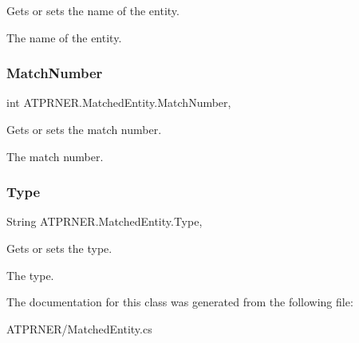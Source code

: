 Gets or sets the name of the entity. 

The name of the entity.\hypertarget{class_a_t_p_r_n_e_r_1_1_matched_entity_ad6ca936e2b54158984f7d7d3753d1490}{}\label{class_a_t_p_r_n_e_r_1_1_matched_entity_ad6ca936e2b54158984f7d7d3753d1490} 
\subsubsection{\texorpdfstring{Match\+Number}{MatchNumber}}
{\footnotesize\ttfamily int A\+T\+P\+R\+N\+E\+R.\+Matched\+Entity.\+Match\+Number\hspace{0.3cm}{\ttfamily [get]}, {\ttfamily [set]}}



Gets or sets the match number. 

The match number.\hypertarget{class_a_t_p_r_n_e_r_1_1_matched_entity_af7d651ec944931f14c26eedffc4150de}{}\label{class_a_t_p_r_n_e_r_1_1_matched_entity_af7d651ec944931f14c26eedffc4150de} 
\subsubsection{\texorpdfstring{Type}{Type}}
{\footnotesize\ttfamily String A\+T\+P\+R\+N\+E\+R.\+Matched\+Entity.\+Type\hspace{0.3cm}{\ttfamily [get]}, {\ttfamily [set]}}



Gets or sets the type. 

The type.

The documentation for this class was generated from the following file\+:\begin{DoxyCompactItemize}
\item 
A\+T\+P\+R\+N\+E\+R/Matched\+Entity.\+cs\end{DoxyCompactItemize}
